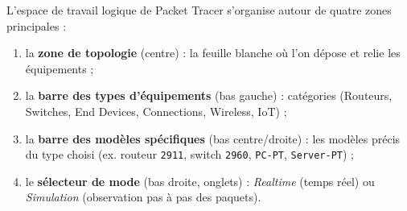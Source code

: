 \documentclass[11pt]{article}
\begin{document}
\begin{propriete}
L'espace de travail logique de Packet Tracer s'organise autour de quatre zones principales :
\begin{enumerate}
    \item la \textbf{zone de topologie} (centre) : la feuille blanche où l'on dépose et relie les équipements ;
    \item la \textbf{barre des types d'équipements} (bas gauche) : catégories (Routeurs, Switches, End Devices, Connections, Wireless, IoT) ;
    \item la \textbf{barre des modèles spécifiques} (bas centre/droite) : les modèles précis du type choisi (ex. routeur \texttt{2911}, switch \texttt{2960}, \texttt{PC-PT}, \texttt{Server-PT}) ;
    \item le \textbf{sélecteur de mode} (bas droite, onglets) : \emph{Realtime} (temps réel) ou \emph{Simulation} (observation pas à pas des paquets).
\end{enumerate}
\end{propriete}
\end{document}
